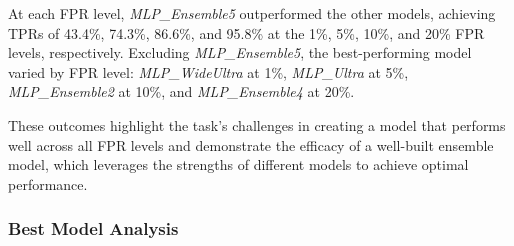 At each FPR level, \textit{MLP\_Ensemble5} outperformed the other models, 
achieving TPRs of 43.4\%, 74.3\%, 86.6\%, and 95.8\% at the 1\%, 5\%, 10\%, and 20\% FPR levels, 
respectively. Excluding \textit{MLP\_Ensemble5}, the best-performing model varied by 
FPR level: \textit{MLP\_WideUltra} at 1\%, \textit{MLP\_Ultra} at 5\%, \textit{MLP\_Ensemble2} at 10\%, 
and \textit{MLP\_Ensemble4} at 20\%.

These outcomes highlight the task's challenges in creating a model that performs well across all FPR 
levels and demonstrate the efficacy of a well-built ensemble model, which leverages the strengths of 
different models to achieve optimal performance.

\subsubsection{Best Model Analysis}


